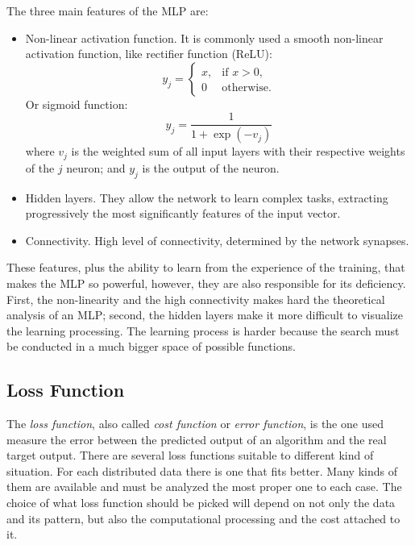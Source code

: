 The three main features of the MLP are:
%
\begin{itemize}
    \item Non-linear activation function. It is commonly used a smooth non-linear activation function, like rectifier function (ReLU):
    \begin{equation}
        y_j = \left\{%
        \begin{array}{ll}
            x, & \text{if } x > 0, \\
            0  & \text{otherwise.}
        \end{array} \right.
    \end{equation}
    Or sigmoid function:
    \begin{equation}
        y_j = \frac{1}{1+\exp(-v_j)}
        \label{eq:sigmoid_function}
    \end{equation}
    where \(v_j\) is the weighted sum of all input layers with their respective weights of the \(j\) neuron; and \(y_j\) is the output of the neuron.
    \item Hidden layers. They allow the network to learn complex tasks, extracting progressively the most significantly features of the input vector.
    \item Connectivity. High level of connectivity, determined by the network synapses.
\end{itemize}

These features, plus the ability to learn from the experience of the training, that makes the MLP so powerful, however, they are also responsible for its deficiency. 
First, the non-linearity and the high connectivity makes hard the theoretical analysis of an MLP; second, the hidden layers make it more difficult to visualize the learning processing. 
The learning process is harder because the search must be conducted in a much bigger space of possible functions.

\subsection{Loss Function}\label{sec:loss_function}

The \emph{loss function}, also called \emph{cost function} or \emph{error function}, is the one used measure the error between the predicted output of an algorithm and the real target output. 
There are several loss functions suitable to different kind of situation. 
For each distributed data there is one that fits better.
Many kinds of them are available and must be analyzed the most proper one to each case. 
The choice of what loss function should be picked will depend on not only the data and its pattern, but also the computational processing and the cost attached to it.


